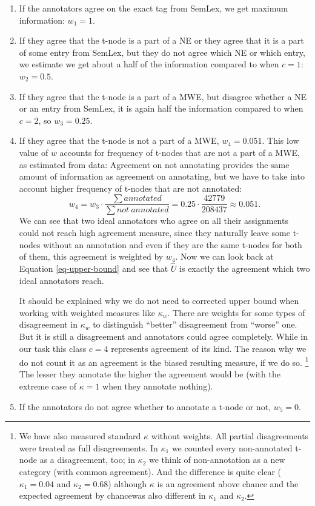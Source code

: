 \begin{enumerate}[$c=1$]
\item
If the annotators agree on the exact tag from SemLex, we get maximum information: $w_1 = 1$.
\item
If they agree that the t-node is a part of a NE or they agree that it is a part of some entry from SemLex, but they do not agree which NE or which entry, we estimate we get about a half of the information compared to when $c=1$: $w_2 = 0.5$.
\item
If they agree that the t-node is a part of a MWE, but disagree whether a NE or an entry from SemLex, it is again half the information compared to when $c=2$, so $w_3 = 0.25$.
\item
If they agree that the t-node is not a part of a MWE, $w_4 = 0.051$. This low value of $w$ accounts for frequency of t-nodes that are not a part of a MWE, as estimated from data: Agreement on not annotating provides the same amount of information as agreement on annotating, but we have to take into account higher frequency of t-nodes that are not annotated: 
  \[  w_4 = w_3 \cdot \frac{\sum annotated}{\sum not\ annotated} = 0.25 \cdot \frac{42779}{208437} \approx 0.051. \]
We can see that two ideal annotators who agree on all their assignments could not reach high agreement measure, since they naturally leave some t-nodes without an annotation and even if they are the same t-nodes for both of them, this agreement is weighted by $w_4$. Now we can look back at Equation \ref{eq-upper-bound} and see that $\widehat{U}$ is exactly the agreement which two ideal annotators reach.

It should be explained why we do not need to corrected upper bound when working with weighted measures like $\kappa_w$.
There are weights for some types of disagreement in $\kappa_w$ to distinguish ``better'' disagreement from ``worse'' one. But it is still a disagreement and annotators could agree completely. While in our task this class $c=4$ represents agreement of its kind. The reason why we do not count it as an agreement is the biased resulting measure, if we do so.%
\footnote{%
We have also measured standard $\kappa$ without weights. All partial disagreements were treated as full disagreements. In $\kappa_1$ we counted every non-annotated t-node as a disagreement, too; in $\kappa_2$ we think of non-annotation as a new category (with common agreement). And the difference is quite clear ($\kappa_1 = 0.04$ and $\kappa_2 = 0.68$) although $\kappa$ is an agreement above chance and the expected agreement by chancewas also different in $\kappa_1$ and $\kappa_2$.}
The lesser they annotate the higher the agreement would be (with the extreme case of $\kappa = 1$ when they annotate nothing).
 
\item
If the annotators do not agree whether to annotate a t-node or not, $w_5 = 0$. 
\end{enumerate}

